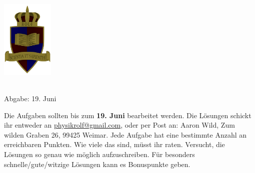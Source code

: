 \documentclass[a4paper]{article}
\begin{document}
	\vspace*{-2cm}
	\parbox{4cm}{\includegraphics[width=2.5cm]{../images/ROLF4.png}}
	\parbox{10.6cm}{ \\ Abgabe: 19. Juni \\ \vspace*{-.5cm} }
	
	

\thispagestyle{empty}
\begin{framed}
	\noindent
	\scriptsize
	Die Aufgaben sollten bis zum \textbf{19. Juni} bearbeitet werden. Die Lösungen schickt ihr entweder an \href{mailto:physikrolf@gmail.com}{physikrolf@gmail.com}, oder per Post an: Aaron Wild, Zum wilden Graben 26, 99425 Weimar.
	Jede Aufgabe hat eine bestimmte Anzahl an erreichbaren Punkten. Wie viele das sind, müsst ihr raten. Versucht, die Lösungen so genau wie möglich aufzuschreiben. Für besonders schnelle/gute/witzige Lösungen kann es Bonuspunkte geben.
\end{framed}

\noindent







%
%
\end{document}
